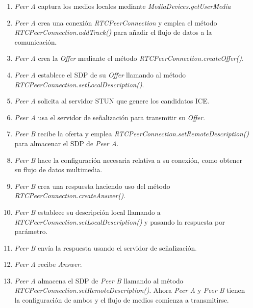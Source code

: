 \documentclass[a4paper, 12pt]{book}
\begin{document}
\begin{enumerate}
\item \textit{Peer A} captura los medios locales mediante \textit{MediaDevices.getUserMedia}

\item \textit{Peer A} crea una conexión \textit{RTCPeerConnection} y emplea el método \textit{RTCPeerConnection.addTrack()} para añadir el flujo de datos a la comunicación.

\item \textit{Peer A} crea la \textit{Offer} mediante el método \textit{RTCPeerConnection.createOffer()}.

\item \textit{Peer A} establece el SDP de su \textit{Offer} llamando al método \textit{RTCPeerConnection.setLocalDescription()}.

\item \textit{Peer A} solicita al servidor STUN que genere los candidatos ICE.

\item \textit{Peer A} usa el servidor de señalización para transmitir su \textit{Offer}.

\item \textit{Peer B} recibe la oferta y emplea \textit{RTCPeerConnection.setRemoteDescription()} para almacenar el SDP de \textit{Peer A}.

\item \textit{Peer B} hace la configuración necesaria relativa a su conexión, como obtener su flujo de datos multimedia.

\item \textit{Peer B} crea una respuesta haciendo uso del método \textit{RTCPeerConnection.createAnswer()}.

\item \textit{Peer B} establece su descripción local llamando a \textit{RTCPeerConnection.setLocalDescription()} y pasando la respuesta por parámetro.

\item \textit{Peer B} envía la respuesta usando el servidor de señalización.

\item \textit{Peer A} recibe \textit{Answer}.

\item \textit{Peer A} almacena el SDP de \textit{Peer B} llamando al método \textit{RTCPeerConnection.setRemoteDescription()}. Ahora \textit{Peer A} y \textit{Peer B} tienen la configuración de ambos y el flujo de medios comienza a transmitirse.
\end{enumerate}
\end{document}
